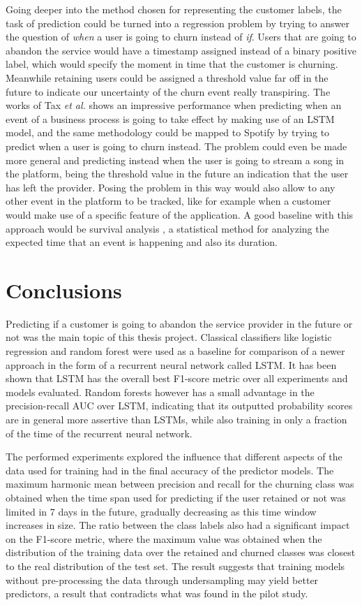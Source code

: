 \documentclass{kththesis}
\begin{document}
Going deeper into the method chosen for representing the customer labels, the task of prediction could be turned into a regression problem by trying to answer the question of \emph{when} a user is going to churn instead of \emph{if}. Users that are going to abandon the service would have a timestamp assigned instead of a binary positive label, which would specify the moment in time that the customer is churning. Meanwhile retaining users could be assigned a threshold value far off in the future to indicate our uncertainty of the churn event really transpiring. The works of Tax \emph{et al.}\citep{Tax2016} shows an impressive performance when predicting when an event of a business process is going to take effect by making use of an LSTM model, and the same methodology could be mapped to Spotify by trying to predict when a user is going to churn instead. The problem could even be made more general and predicting instead when the user is going to stream a song in the platform, being the threshold value in the future an indication that the user has left the provider. Posing the problem in this way would also allow to any other event in the platform to be tracked, like for example when a customer would make use of a specific feature of the application. A good baseline with this approach would be survival analysis \citep{ibrahim2005bayesian}, a statistical method for analyzing the expected time that an event is happening and also its duration.


\chapter{Conclusions}
\label{cha:conclusion}

Predicting if a customer is going to abandon the service provider in the future or not was the main topic of this thesis project. Classical classifiers like logistic regression and random forest were used as a baseline for comparison of a newer approach in the form of a recurrent neural network called LSTM. It has been shown that LSTM has the overall best F1-score metric over all experiments and models evaluated. Random forests however has a small advantage in the precision-recall AUC over LSTM, indicating that its outputted probability scores are in general more assertive than LSTMs, while also training in only a fraction of the time of the recurrent neural network.

The performed experiments explored the influence that different aspects of the data used for training had in the final accuracy of the predictor models. The maximum harmonic mean between precision and recall for the churning class was obtained when the time span used for predicting if the user retained or not was limited in 7 days in the future, gradually decreasing as this time window increases in size. The ratio between the class labels also had a significant impact on the F1-score metric, where the maximum value was obtained when the distribution of the training data over the retained and churned classes was closest to the real distribution of the test set. The result suggests that training models without pre-processing the data through undersampling may yield better predictors, a result that contradicts what was found in the pilot study.
\end{document}

